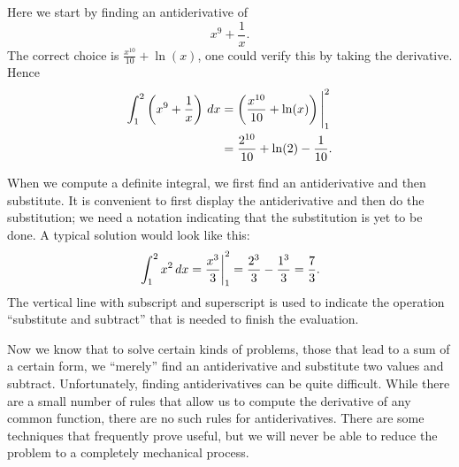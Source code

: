 \documentclass{ximera}
\begin{document}
\begin{solution}
Here we start by finding an antiderivative of 
\[
x^9 + \frac{1}{x}.
\]
The correct choice is $\frac{x^{10}}{10} + \ln(x)$, one could verify this by
taking the derivative. Hence
\begin{align*}
\int_1^2\left(x^9 + \frac{1}{x}\right) \,d x &= \left(\frac{x^{10}}{10} + \ln(x)\right)\Bigg|_1^2 \\
&= \frac{2^{10}}{10} + \ln(2) - \frac{1}{10}.
\end{align*}
\end{solution}


When we compute a definite integral, we first find an antiderivative
and then substitute. It is convenient to first display the
antiderivative and then do the substitution; we need a notation
indicating that the substitution is yet to be done. A typical solution
would look like this:
\[
  \left.\int_1^2 x^2\,d x={x^3\over 3}\right|_1^2 = 
  {2^3\over3}-{1^3\over3}={7\over3}.
\]
The vertical line with subscript and superscript is used to indicate
the operation ``substitute and subtract'' that is needed to finish the
evaluation. 

Now we know that to solve certain kinds of problems, those that lead
to a sum of a certain form, we ``merely'' find an antiderivative and
substitute two values and subtract. Unfortunately, finding
antiderivatives can be quite difficult. While there are a small number
of rules that allow us to compute the derivative of any common
function, there are no such rules for antiderivatives. There are some
techniques that frequently prove useful, but we will never be able to
reduce the problem to a completely mechanical process.
\end{document}
